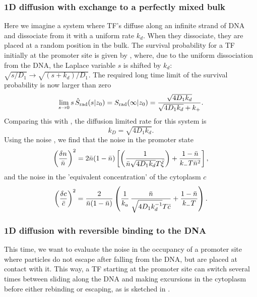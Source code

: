 \subsubsection{1D diffusion with exchange to a perfectly mixed bulk}
Here we imagine a system where TF's diffuse along an infinite strand of DNA and dissociate from it with a uniform rate $k_d$. When they dissociate, they are placed at a random position in the bulk. The survival probability for a TF initially at the promoter site is given by , where, due to the uniform dissociation from the DNA, the Laplace variable $s$ is shifted by $k_d$: $\sqrt{s/D_1} \to \sqrt{(s+k_d)/D_1}$. The required long time limit of the survival probability is now larger than zero
\begin{equation}
 \lim_{s\to0} s \, \hat{S}_{\rm rad}(s|z_0) = S_{\rm rad}(\infty|z_0) = \frac{\sqrt{4 D_1 k_d}}{\sqrt{4 D_1 k_d} + k_+}.
\end{equation}
Comparing this with , the diffusion limited rate for this system is
\begin{equation}
k_D = \sqrt{4 D_1 k_d}.
\end{equation}
Using the noise , we find that the noise in the promoter state
\begin{equation}
 \elabel{NoiseProWM}
 \left( \frac{\delta n}{\bar{n}} \right)^2 = 2 \bar{n}(1-\bar{n})\left[\left( \frac{1}{\bar{n} \sqrt{4 D_1 k_d} T \bar{\xi}} \right)+\frac{1-\bar{n}}{k_- T \bar{n}^2} \right],
\end{equation}
and the noise in the 'equivalent concentration' of the cytoplasm $c$
\begin{equation}
 \elabel{NoiseCWM} 
 \left( \frac{\delta c}{\bar{c}} \right)^2 = \frac{2}{\bar{n}(1-\bar{n})} \left( \frac{1}{k_a} \, \frac{\bar{n}}{\sqrt{4 D_1 k_d^{-1}} T \bar{c}} + \frac{1-\bar{n}}{k_- T}  \right).
\end{equation}


\subsubsection{1D diffusion with reversible binding to the DNA}
This time, we want to evaluate the noise in the occupancy of a promoter site where particles do not escape after falling from the DNA, but are placed at contact with it. This way, a TF starting at the promoter site can switch several times between sliding along the DNA and making excursions in the cytoplasm before either rebinding or escaping, as is sketched in . 

